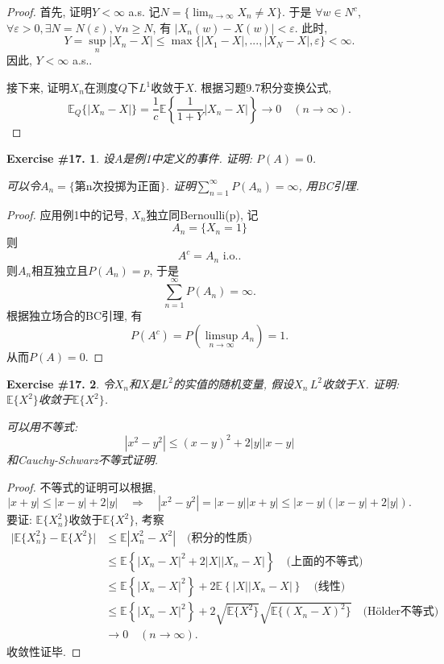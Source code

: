 \documentclass[UTF8, a4paper]{article}
\newtheorem{exercise}{Exercise \#17.}
\begin{document}
\begin{proof}

首先, 证明\(Y < \infty\) a.s.    
记\(N = \{\lim_{n\to\infty} X_n \neq X\}\). 于是
\(\forall w\in N^c\), \(\forall \varepsilon >0, \exists N = N(\varepsilon), \forall n \geq N\), 有
\(|X_n(w) - X(w)| < \varepsilon\).
此时, 
$$
Y = \sup_n|X_n - X| \leq \max\{|X_1 - X|, ..., |X_N - X|, \varepsilon\} < \infty.
$$
因此, \(Y < \infty\) a.s..

接下来, 证明\(X_n\)在测度\(Q\)下\(L^1\)收敛于\(X\). 根据习题9.7积分变换公式, 
$$
\mathbb{E}_Q\{|X_n - X|\} = \frac{1}{c}\mathbb{E}\left\{\frac{1}{1+Y}|X_n - X|\right\}\to 0 \quad (n\to \infty).
$$
\end{proof}



\begin{framed}
\begin{exercise}
设\(A\)是例1中定义的事件. 证明: \(P(A) = 0\).

可以令\(A_n = \{\text{第n次投掷为正面}\}\).
证明\(\sum_{n=1}^{\infty} P(A_n) = \infty\), 用BC引理.
\end{exercise}
\end{framed}

\begin{proof}
应用例1中的记号, \(X_n\)独立同Bernoulli(p), 
记 
$$
A_n = \{X_n = 1\}
$$
则 
$$
A^c = A_n \text{ i.o.}.
$$
则\(A_n\)相互独立且\(P(A_n) = p\), 于是
$$
\sum_{n=1}^{\infty} P(A_n) = \infty.
$$
根据独立场合的BC引理, 有
$$
P(A^c) = P\left(\limsup_{n\to\infty} A_n\right) = 1.
$$
从而\(P(A) = 0\).
\end{proof}


\begin{framed}
\begin{exercise}
令\(X_n\)和\(X\)是\(L^2\)的实值的随机变量, 假设\(X_n\)\(\,L^2\)收敛于\(X\).
证明: \(\mathbb{E}\{X^2\}\)收敛于\(\mathbb{E}\{X^2\}\).

可以用不等式:
$$
|x^2 - y^2| \leq (x - y)^2 + 2|y||x - y|
$$
和Cauchy-Schwarz不等式证明.
\end{exercise}
\end{framed}


\begin{proof}
不等式的证明可以根据, 
$$
|x+y| \leq |x - y| + 2|y| \quad \Rightarrow \quad |x^2 - y^2| = |x-y||x+y| \leq |x-y|(|x-y| + 2|y|).
$$
要证: \(\mathbb{E}\{X_n^2\}\)收敛于\(\mathbb{E}\{X^2\}\), 考察
$$
\begin{aligned}
    \big|\mathbb{E}\{X_n^2\} - \mathbb{E}\{X^2\}\big| &\leq \mathbb{E}\left|X_n^2 - X^2\right| \quad \text{(积分的性质)} \\
    &\leq \mathbb{E}\left\{|X_n - X|^2 + 2|X||X_n - X|\right\} \quad \text{(上面的不等式)}\\
    &\leq \mathbb{E}\left\{|X_n - X|^2\right\} + 2\mathbb{E}\left\{|X||X_n - X|\right\} \quad \text{(线性)} \\
    &\leq \mathbb{E}\left\{|X_n - X|^2\right\} + 2\sqrt{\mathbb{E}\{X^2\}}\sqrt{\mathbb{E}\{(X_n - X)^2\}} \quad \text{(H\"older不等式)} \\
    & \to 0 \quad (n\to \infty).
\end{aligned}
$$
收敛性证毕.
\end{proof}
\end{document}
